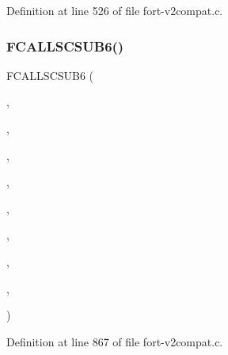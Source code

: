 Definition at line 526 of file fort-\/v2compat.\+c.

\mbox{\label{fort-v2compat_8c_acbc5b23349d9fffa6fbf7205138dac99}} 
\subsubsection{\texorpdfstring{F\+C\+A\+L\+L\+S\+C\+S\+U\+B6()}{FCALLSCSUB6()}\hspace{0.1cm}{\footnotesize\ttfamily [2/6]}}
{\footnotesize\ttfamily F\+C\+A\+L\+L\+S\+C\+S\+U\+B6 (\begin{DoxyParamCaption}\item[{\hyperlink{nf__v2compat_8c_a103ae6935428dfecde0657594a2206f6}{c\+\_\+ncvpt}}]{,  }\item[{N\+C\+V\+PT}]{,  }\item[{\hyperlink{nf__fortv2_8f90_a0e80dc4b1c7ad7772f48f31480a61237}{ncvpt}}]{,  }\item[{N\+C\+ID}]{,  }\item[{V\+A\+R\+ID}]{,  }\item[{C\+O\+O\+R\+DS}]{,  }\item[{C\+O\+U\+N\+TS}]{,  }\item[{P\+V\+O\+ID}]{,  }\item[{\hyperlink{fort-v2compat_8c_ae2352f39cbd25bcaf1bedbbb12db73fe}{P\+R\+C\+O\+DE}}]{ }\end{DoxyParamCaption})}



Definition at line 867 of file fort-\/v2compat.\+c.

\mbox{\label{fort-v2compat_8c_a9a398103d54bd402c86b46616569ef30}} 
